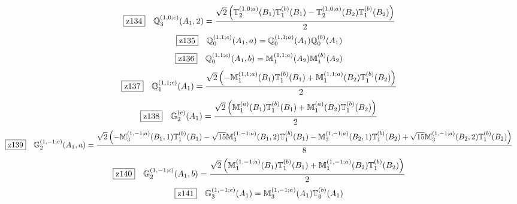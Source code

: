 \documentclass[fleqn,10pt,landscape]{jsarticle}
\begin{document}
\begin{dmath*}
\hspace*{3mm}\fbox{z134}\quad \mathbb{Q}_{3}^{(1,0;c)}(A_{1},2)=\frac{\sqrt{2} \left(\mathbb{T}_{2}^{(1,0;a)}(B_{1}) \mathbb{T}_{1}^{(b)}(B_{1}) - \mathbb{T}_{2}^{(1,0;a)}(B_{2}) \mathbb{T}_{1}^{(b)}(B_{2})\right)}{2}
\end{dmath*}
\begin{dmath*}
\hspace*{3mm}\fbox{z135}\quad \mathbb{Q}_{0}^{(1,1;c)}(A_{1},a)=\mathbb{Q}_{0}^{(1,1;a)}(A_{1}) \mathbb{Q}_{0}^{(b)}(A_{1})
\end{dmath*}
\begin{dmath*}
\hspace*{3mm}\fbox{z136}\quad \mathbb{Q}_{0}^{(1,1;c)}(A_{1},b)=\mathbb{M}_{1}^{(1,1;a)}(A_{2}) \mathbb{M}_{1}^{(b)}(A_{2})
\end{dmath*}
\begin{dmath*}
\hspace*{3mm}\fbox{z137}\quad \mathbb{Q}_{1}^{(1,1;c)}(A_{1})=\frac{\sqrt{2} \left(- \mathbb{M}_{1}^{(1,1;a)}(B_{1}) \mathbb{T}_{1}^{(b)}(B_{1}) + \mathbb{M}_{1}^{(1,1;a)}(B_{2}) \mathbb{T}_{1}^{(b)}(B_{2})\right)}{2}
\end{dmath*}
\begin{dmath*}
\hspace*{3mm}\fbox{z138}\quad \mathbb{G}_{2}^{(c)}(A_{1})=\frac{\sqrt{2} \left(\mathbb{M}_{1}^{(a)}(B_{1}) \mathbb{T}_{1}^{(b)}(B_{1}) + \mathbb{M}_{1}^{(a)}(B_{2}) \mathbb{T}_{1}^{(b)}(B_{2})\right)}{2}
\end{dmath*}
\begin{dmath*}
\hspace*{3mm}\fbox{z139}\quad \mathbb{G}_{2}^{(1,-1;c)}(A_{1},a)=\frac{\sqrt{2} \left(- \mathbb{M}_{3}^{(1,-1;a)}(B_{1},1) \mathbb{T}_{1}^{(b)}(B_{1}) - \sqrt{15} \mathbb{M}_{3}^{(1,-1;a)}(B_{1},2) \mathbb{T}_{1}^{(b)}(B_{1}) - \mathbb{M}_{3}^{(1,-1;a)}(B_{2},1) \mathbb{T}_{1}^{(b)}(B_{2}) + \sqrt{15} \mathbb{M}_{3}^{(1,-1;a)}(B_{2},2) \mathbb{T}_{1}^{(b)}(B_{2})\right)}{8}
\end{dmath*}
\begin{dmath*}
\hspace*{3mm}\fbox{z140}\quad \mathbb{G}_{2}^{(1,-1;c)}(A_{1},b)=\frac{\sqrt{2} \left(\mathbb{M}_{1}^{(1,-1;a)}(B_{1}) \mathbb{T}_{1}^{(b)}(B_{1}) + \mathbb{M}_{1}^{(1,-1;a)}(B_{2}) \mathbb{T}_{1}^{(b)}(B_{2})\right)}{2}
\end{dmath*}
\begin{dmath*}
\hspace*{3mm}\fbox{z141}\quad \mathbb{G}_{3}^{(1,-1;c)}(A_{1})=\mathbb{M}_{3}^{(1,-1;a)}(A_{1}) \mathbb{T}_{0}^{(b)}(A_{1})
\end{dmath*}
\end{document}
